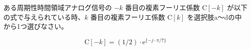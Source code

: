 ある周期性時間領域アナログ信号の $-k$ 番目の複素フーリエ係数 $\textrm{C}[-k]$ が以下の式で与えられている時、$k$ 番目の複素フーリエ係数 $\textrm{C}[k]$ を選択肢a〜dの中から1つ選びなさい。

\[
\textrm{C}[-k] = (1/2) \cdot \textrm{e}^{\{ -j \cdot \pi/7 \}}
\]
